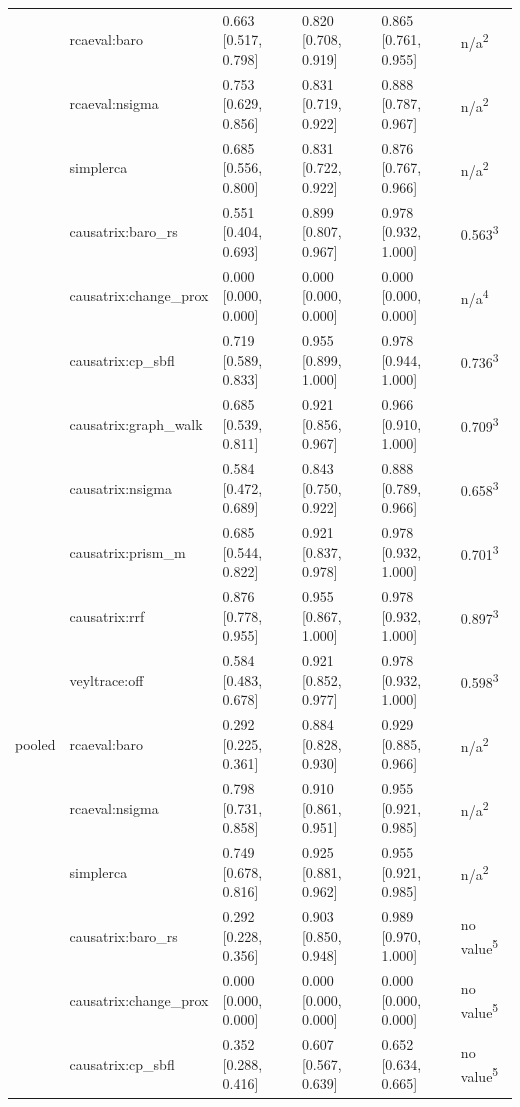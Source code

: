 \begin{table}[t]
\begin{tabular}{@{}llllll@{}}
 & rcaeval:baro & 0.663 [0.517, 0.798] & 0.820 [0.708, 0.919] & 0.865 [0.761, 0.955] & n/a\textsuperscript{2} \\
 & rcaeval:nsigma & 0.753 [0.629, 0.856] & 0.831 [0.719, 0.922] & 0.888 [0.787, 0.967] & n/a\textsuperscript{2} \\
 & simplerca & 0.685 [0.556, 0.800] & 0.831 [0.722, 0.922] & 0.876 [0.767, 0.966] & n/a\textsuperscript{2} \\
 & causatrix:baro\_rs & 0.551 [0.404, 0.693] & 0.899 [0.807, 0.967] & 0.978 [0.932, 1.000] & 0.563\textsuperscript{3} \\
 & causatrix:change\_prox & 0.000 [0.000, 0.000] & 0.000 [0.000, 0.000] & 0.000 [0.000, 0.000] & n/a\textsuperscript{4} \\
 & causatrix:cp\_sbfl & 0.719 [0.589, 0.833] & 0.955 [0.899, 1.000] & 0.978 [0.944, 1.000] & 0.736\textsuperscript{3} \\
 & causatrix:graph\_walk & 0.685 [0.539, 0.811] & 0.921 [0.856, 0.967] & 0.966 [0.910, 1.000] & 0.709\textsuperscript{3} \\
 & causatrix:nsigma & 0.584 [0.472, 0.689] & 0.843 [0.750, 0.922] & 0.888 [0.789, 0.966] & 0.658\textsuperscript{3} \\
 & causatrix:prism\_m & 0.685 [0.544, 0.822] & 0.921 [0.837, 0.978] & 0.978 [0.932, 1.000] & 0.701\textsuperscript{3} \\
 & causatrix:rrf & 0.876 [0.778, 0.955] & 0.955 [0.867, 1.000] & 0.978 [0.932, 1.000] & 0.897\textsuperscript{3} \\
 & veyltrace:off & 0.584 [0.483, 0.678] & 0.921 [0.852, 0.977] & 0.978 [0.932, 1.000] & 0.598\textsuperscript{3} \\
pooled & rcaeval:baro & 0.292 [0.225, 0.361] & 0.884 [0.828, 0.930] & 0.929 [0.885, 0.966] & n/a\textsuperscript{2} \\
 & rcaeval:nsigma & 0.798 [0.731, 0.858] & 0.910 [0.861, 0.951] & 0.955 [0.921, 0.985] & n/a\textsuperscript{2} \\
 & simplerca & 0.749 [0.678, 0.816] & 0.925 [0.881, 0.962] & 0.955 [0.921, 0.985] & n/a\textsuperscript{2} \\
 & causatrix:baro\_rs & 0.292 [0.228, 0.356] & 0.903 [0.850, 0.948] & 0.989 [0.970, 1.000] & no value\textsuperscript{5} \\
 & causatrix:change\_prox & 0.000 [0.000, 0.000] & 0.000 [0.000, 0.000] & 0.000 [0.000, 0.000] & no value\textsuperscript{5} \\
 & causatrix:cp\_sbfl & 0.352 [0.288, 0.416] & 0.607 [0.567, 0.639] & 0.652 [0.634, 0.665] & no value\textsuperscript{5} \\

\end{tabular}
\end{table}
